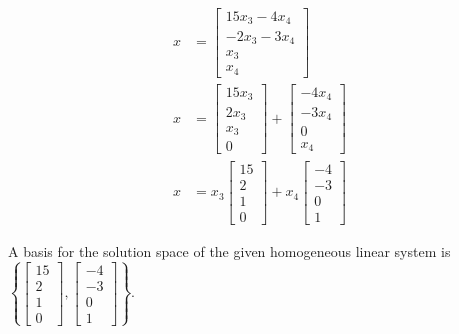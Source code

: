 \documentclass{article}
\begin{document}
\begin{align*}
	x & =
		\begin{bmatrix}
			15x_3 - 4x_4 \\
			-2x_3 - 3x_4 \\
			x_3 \\
			x_4
		\end{bmatrix} \\
	x & =
		\begin{bmatrix}
			15x_3 \\
			2x_3 \\
			x_3 \\
			0
		\end{bmatrix}
		+ \begin{bmatrix}
			-4x_4 \\
			-3x_4 \\
			0 \\
			x_4
		\end{bmatrix} \\
	x & =
		x_3 \begin{bmatrix} 15 \\ 2 \\ 1 \\ 0 \end{bmatrix}
		+ x_4 \begin{bmatrix} -4 \\ -3 \\ 0 \\ 1 \end{bmatrix}
\end{align*}
\begin{mdframed}
	A basis for the solution space of the given homogeneous linear system is $ \left\{ \begin{bmatrix} 15 \\ 2 \\ 1 \\ 0 \end{bmatrix}, \begin{bmatrix} -4 \\ -3 \\ 0 \\ 1 \end{bmatrix} \right\} $.
\end{mdframed}
\end{document}
